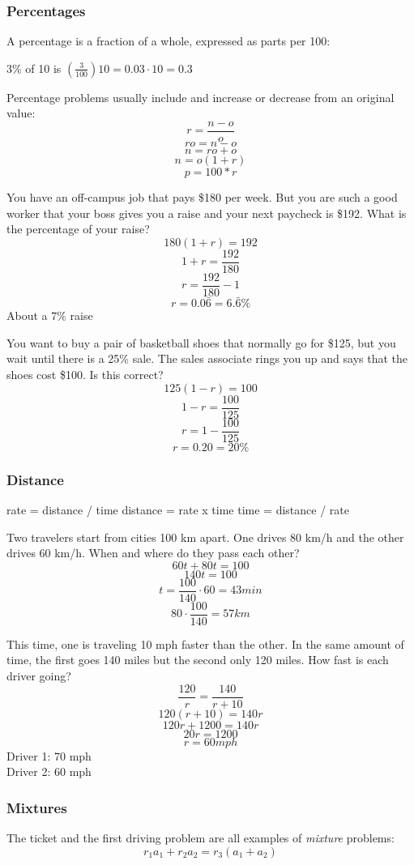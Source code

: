 \documentclass[letterpaper,12pt,fleqn]{article}
\begin{document}
\subsubsection*{Percentages}

A percentage is a fraction of a whole, expressed as parts per 100:

$3\%$ of 10 is $\left(\frac{3}{100}\right)10=0.03\cdot10=0.3$

Percentage problems usually include and increase or decrease from an original
value:
\[r=\frac{n-o}{o}\]
\[ro=n-o\]
\[n=ro+o\]
\[n=o(1+r)\]
\[p=100*r\]

You have an off-campus job that pays \$180 per week. But you are such a good
worker that your boss gives you a raise and your next paycheck is \$192. What
is the percentage of your raise?
\[180(1+r)=192\]
\[1+r=\frac{192}{180}\]
\[r=\frac{192}{180}-1\]
\[r=0.0\bar{6}=6.\bar{6}\%\]
About a $7\%$ raise

\bigskip

You want to buy a pair of basketball shoes that normally go for \$125, but you
wait until there is a 25\% sale. The sales associate rings you up and says that
the shoes cost \$100. Is this correct?
\[125(1-r)=100\]
\[1-r=\frac{100}{125}\]
\[r=1-\frac{100}{125}\]
\[r=0.20=20\%\]

\subsubsection*{Distance}

rate = distance / time
distance = rate x time
time = distance / rate

Two travelers start from cities 100 km apart. One drives 80 km/h and the other
drives 60 km/h. When and where do they pass each other?
\[60t+80t=100\]
\[140t=100\]
\[t=\frac{100}{140}\cdot60=43 min\]
\[80\cdot\frac{100}{140}=57 km\]

This time, one is traveling 10 mph faster than the other. In the same amount of
time, the first goes 140 miles but the second only 120 miles.  How fast is
each driver going?
\[\frac{120}{r}=\frac{140}{r+10}\]
\[120(r+10)=140r\]
\[120r+1200=140r\]
\[20r=1200\]
\[r=60 mph\]
Driver 1: 70 mph \\
Driver 2: 60 mph

\subsubsection*{Mixtures}

The ticket and the first driving problem are all examples of \emph{mixture}
problems:
\[r_1a_1+r_2a_2=r_3(a_1+a_2)\]
\end{document}
